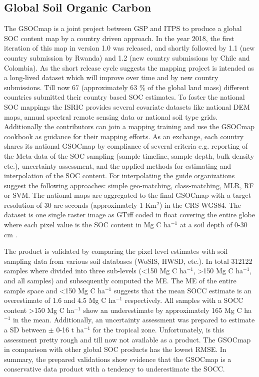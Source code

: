 	\subsection{Global Soil Organic Carbon}
		The \ac{GSOCmap} is a joint project between \ac{GSP} and \ac{ITPS} to produce a global \ac{SOC} content map by a country driven approach. In the year 2018, the first iteration of this map in version 1.0 was released, and shortly followed by 1.1 (new country submission by Rwanda) and 1.2 (new country submissions by Chile and Colombia). As the short release cycle suggests the mapping project is intended as a long-lived dataset which will improve over time and by new country submissions. Till now 67 (approximately 63 \% of the global land mass) different countries submitted their country based \ac{SOC} estimates. To foster the national \ac{SOC} mappings the \ac{ISRIC} provides several covariate datasets like national \ac{DEM} maps, annual spectral remote sensing data or national soil type grids. Additionally the contributors can join a mapping training and use the \ac{GSOCmap} cookbook as guidance for their mapping efforts. As an exchange, each country shares its national \ac{GSOCmap} by compliance of several criteria e.g. reporting of the Meta-data of the \ac{SOC} sampling (sample timeline, sample depth, bulk density etc.), uncertainty assessment, and the applied methods for estimating and interpolation of the \ac{SOC} content. For interpolating the guide organizations suggest the following approaches: simple geo-matching, class-matching, \ac{MLR}, \ac{RF} or \ac{SVM}. The national maps are aggregated to the final \ac{GSOCmap} with a target resolution of 30 arc-seconds (approximately 1 Km$^2$) in the \ac{CRS} \ac{WGS84}. The dataset is one single raster image as \ac{GTiff} coded in float covering the entire globe where each pixel value is the \ac{SOC} content in Mg C ha$^{-1}$ at a soil depth of 0-30 cm \citep{FAO2018}.

		The product is validated by comparing the pixel level estimates with soil sampling data from various soil databases (WoSIS, HWSD, etc.). In total 312122 samples where divided into three sub-levels (<150 Mg C ha$^{-1}$, >150 Mg C ha$^{-1}$, and all samples) and subsequently computed the \ac{ME}. The \ac{ME} of the entire sample space and <150 Mg C ha$^{-1}$ suggests that the mean \ac{SOCC} estimate is an overestimate of 1.6 and 4.5 Mg C ha$^{-1}$ respectively. All samples with a \ac{SOCC} content >150 Mg C ha$^{-1}$ show an underestimate by approximately 165 Mg C ha$^{-1}$ in the mean. Additionally, an uncertainty assessment was prepared to estimate a \ac{SD} between $\pm$ 0-16 t ha$^{-1}$ for the tropical zone. Unfortunately, is this assessment pretty rough and till now not available as a product. The \ac{GSOCmap} in comparison with other global \ac{SOC} products has the lowest \ac{RMSE}. In summary, the prepared validations show evidence that the \ac{GSOCmap} is a conservative data product with a tendency to underestimate the \ac{SOCC}.

